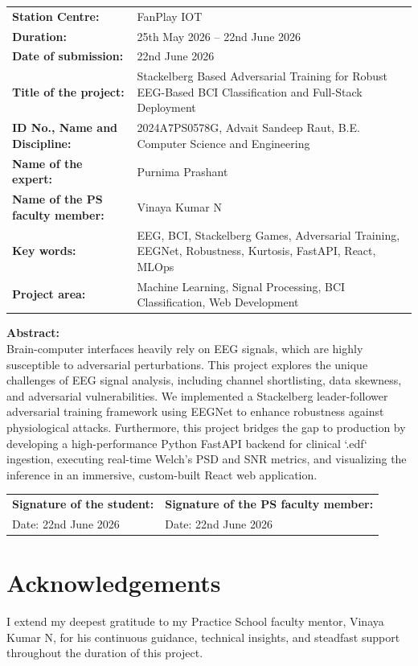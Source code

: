 \documentclass[10pt,a4paper,openright]{report}
\newcommand{\projecttitle}{Stackelberg Based Adversarial Training for Robust EEG-Based BCI Classification and Full-Stack Deployment}
\begin{document}
\small
\renewcommand{\arraystretch}{1.17}
\begin{tabularx}{\textwidth}{>{\bfseries}p{} X}
Station Centre: & FanPlay IOT \\
Duration: & 25th May 2026 -- 22nd June 2026 \\
Date of submission: & 22nd June 2026 \\
Title of the project: & \projecttitle \\
ID No., Name and Discipline: & 2024A7PS0578G, Advait Sandeep Raut, B.E. Computer Science and Engineering \\
Name of the expert: & Purnima Prashant \\
Name of the PS faculty member: & Vinaya Kumar N \\
Key words: & EEG, BCI, Stackelberg Games, Adversarial Training, EEGNet, Robustness, Kurtosis, FastAPI, React, MLOps \\
Project area: & Machine Learning, Signal Processing, BCI Classification, Web Development \\
\end{tabularx}

\vspace{0.12cm}
\textbf{Abstract:}\\
Brain-computer interfaces heavily rely on EEG signals, which are highly susceptible to adversarial perturbations. This project explores the unique challenges of EEG signal analysis, including channel shortlisting, data skewness, and adversarial vulnerabilities. We implemented a Stackelberg leader-follower adversarial training framework using EEGNet to enhance robustness against physiological attacks. Furthermore, this project bridges the gap to production by developing a high-performance Python FastAPI backend for clinical `.edf` ingestion, executing real-time Welch's PSD and SNR metrics, and visualizing the inference in an immersive, custom-built React web application.

\vfill
\begin{tabularx}{\textwidth}{X X}
\textbf{Signature of the student:} & \textbf{Signature of the PS faculty member:} \\[0.75cm]
Date: 22nd June 2026 & Date: 22nd June 2026
\end{tabularx}
\normalsize
\clearpage

\chapter*{Acknowledgements}
\par\noindent
I extend my deepest gratitude to my Practice School faculty mentor, Vinaya Kumar N, for his continuous guidance, technical insights, and steadfast support throughout the duration of this project.
\end{document}
